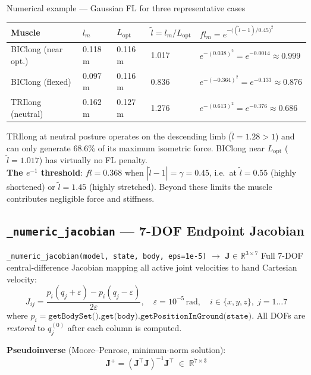\documentclass[11pt,a4paper]{article}
\newcommand{\R}{\mathbb{R}}
\begin{document}
\begin{notebox}[PipeBlue]{Numerical example --- Gaussian FL for three representative cases}
\begin{center}\small
\begin{tabular}{lllll}
\toprule
Muscle & $l_m$ & $L_\text{opt}$ & $\tilde{l}=l_m/L_\text{opt}$ & $fl_m = e^{-\bigl((\tilde{l}-1)/0.45\bigr)^2}$ \\
\midrule
\rowcolor{LightBlue}
BIClong (near opt.) & 0.118\,m & 0.116\,m & 1.017 & $e^{-(0.038)^2}=e^{-0.0014}\approx\mathbf{0.999}$ \\
BIClong (flexed)    & 0.097\,m & 0.116\,m & 0.836 & $e^{-(-0.364)^2}=e^{-0.133}\approx\mathbf{0.876}$ \\
\rowcolor{LightBlue}
TRIlong (neutral)   & 0.162\,m & 0.127\,m & 1.276 & $e^{-(0.613)^2}=e^{-0.376}\approx\mathbf{0.686}$ \\
\bottomrule
\end{tabular}
\end{center}
TRIlong at neutral posture operates on the descending limb ($\tilde{l}=1.28>1$) and can only
generate $68.6\%$ of its maximum isometric force.
BIClong near $L_\text{opt}$ ($\tilde{l}=1.017$) has virtually no FL penalty.\\[4pt]
\textbf{The $e^{-1}$ threshold}: $fl=0.368$ when $|\tilde{l}-1|=\gamma=0.45$, i.e.\
at $\tilde{l}=0.55$ (highly shortened) or $\tilde{l}=1.45$ (highly stretched).
Beyond these limits the muscle contributes negligible force and stiffness.
\end{notebox}

\subsection{\texttt{\_numeric\_jacobian} — 7-DOF Endpoint Jacobian}

\begin{eqbox}{\texttt{\_numeric\_jacobian(model, state, body, eps=1e-5)} $\to$ $\bm{J}\in\R^{3\times7}$}
Full 7-DOF central-difference Jacobian mapping all active joint velocities to
hand Cartesian velocity:
\begin{equation}
J_{ij} = \frac{p_i(q_j + \varepsilon) - p_i(q_j - \varepsilon)}{2\varepsilon},
\quad \varepsilon = 10^{-5}\,\text{rad},
\quad i \in \{x,y,z\},\;j=1\ldots7
\end{equation}
where $p_i = \texttt{getBodySet().get(body).getPositionInGround(state)}$.
All DOFs are \emph{restored} to $q_j^{(0)}$ after each column is computed.

\textbf{Pseudoinverse} (Moore--Penrose, minimum-norm solution):
\begin{equation}
\bm{J}^+ = (\bm{J}^\top\bm{J})^{-1}\bm{J}^\top \;\in\; \R^{7\times3}
\end{equation}
\end{eqbox}
\end{document}
